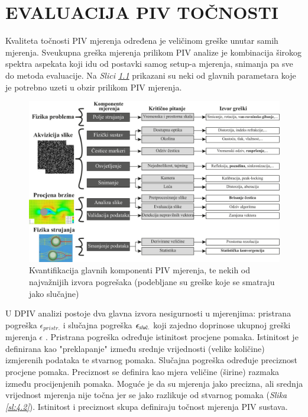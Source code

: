 
\chapter{EVALUACIJA PIV TOČNOSTI}
\label{chap:Poglavlje_4}
Kvaliteta točnosti PIV mjerenja određena je veličinom greške unutar samih mjerenja. Sveukupna greška mjerenja prilikom PIV analize je kombinacija širokog spektra aspekata koji idu od postavki samog setup-a mjerenja, snimanja pa sve do metoda evaluacije. Na \textit{Slici \ref{sl:4.1}} prikazani su neki od glavnih parametara koje je potrebno uzeti u obzir prilikom PIV mjerenja.
\begin{figure}[h]  
	\centering
	\includegraphics[width=16cm]{./4_PIVNesigurnost/slika4_1.pdf} 
	\caption{Kvantifikacija glavnih komponenti PIV mjerenja, te nekih od najvažnijih izvora pogrešaka (podebljane su greške koje se smatraju jako slučajne) \cite{sciacchitano2019_article}}
	\label{sl:4.1}
\end{figure}
\par
U DPIV analizi postoje dva glavna izvora nesigurnosti u mjerenjima: pristrana pogreška $\epsilon_{pristr.}$ i slučajna pogreška $\epsilon_{slu\textup{č}.}$ koji zajedno doprinose ukupnoj greški mjerenja $\epsilon$ \cite{raffel2018_book}. Pristrana pogreška određuje istinitost procjene pomaka. Istinitost je definirana kao "preklapanje" između srednje vrijednosti (velike količine) izmjerenih podataka te stvarnog pomaka. Slučajna pogreška određuje preciznost procjene pomaka. Preciznost se definira kao mjera veličine (širine) razmaka između procijenjenih pomaka. Moguće je da su mjerenja jako precizna, ali srednja vrijednost mjerenja nije točna jer se jako razlikuje od stvarnog pomaka (\textit{Slika \ref{sl:4.2}}). Istinitost i preciznost skupa definiraju točnost mjerenja PIV sustava. 
